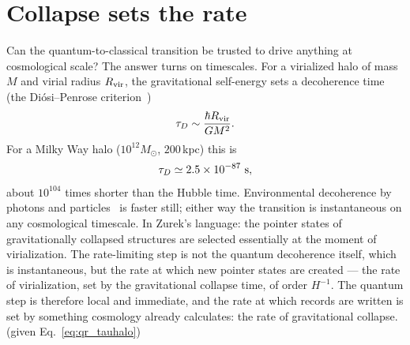 \section{Collapse sets the rate}\label{sec:qr_rate}
Can the quantum-to-classical transition be trusted to drive anything at cosmological scale? The answer turns on timescales. For a virialized halo of
mass $M$ and virial radius $R_{\rm vir}$, the gravitational self-energy sets a decoherence time (the Di\'osi--Penrose criterion~\cite{Diosi1989,Penrose1996})
\begin{equation}
\tau_D\sim\frac{\hbar R_{\rm vir}}{GM^2}.\label{eq:qr_tauhalo}
\end{equation}
For a Milky Way halo ($10^{12}M_\odot$, $200$\,kpc) this is
\begin{equation}
\tau_D\simeq2.5\times10^{-87}\ {\rm s},\label{eq:qr_tauMW}
\end{equation}
about $10^{104}$ times shorter than the Hubble time. \calc{} Environmental decoherence by photons and particles~\cite{JoosZeh1985} is faster still;
either way the transition is instantaneous on any cosmological timescale. In Zurek's language: the pointer states of gravitationally collapsed
structures are selected essentially at the moment of virialization. The rate-limiting step is not the quantum decoherence itself, which is
instantaneous, but the rate at which new pointer states are created --- the rate of virialization, set by the gravitational collapse time, of order
$H^{-1}$. The quantum step is therefore local and immediate, and the rate at which records are written is set by something cosmology already calculates:
the rate of gravitational collapse. \derived{} (given Eq.~\ref{eq:qr_tauhalo})

